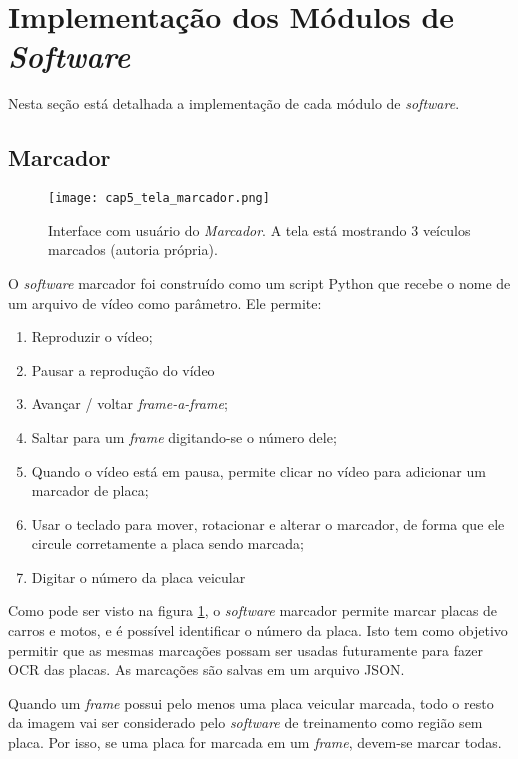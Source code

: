 \section{Implementação dos Módulos de \emph{Software}} \label{sec:cap5_impl}

Nesta seção está detalhada a implementação de cada módulo de \emph{software}.

\subsection{Marcador}

\begin{figure}[!htb]
	\centering
	\texttt{[image: cap5\_tela\_marcador.png]}
	\caption[Interface com usuário do \emph{Marcador}]{
		Interface com usuário do \emph{Marcador}.
		A tela está mostrando 3 veículos marcados (autoria própria).}
	\label{fig:cap5_tela_marcador}
\end{figure}

O \emph{software} marcador foi construído como um script Python que recebe o
nome de um arquivo de vídeo como parâmetro. Ele permite:

\begin{enumerate}
\item Reproduzir o vídeo;
\item Pausar a reprodução do vídeo
\item Avançar / voltar \emph{frame-a-frame};
\item Saltar para um \emph{frame} digitando-se o número dele;
\item Quando o vídeo está em pausa, permite clicar no vídeo para adicionar um
	marcador de placa;
\item Usar o teclado para mover, rotacionar e alterar o marcador, de forma que ele
	circule corretamente a placa sendo marcada;
\item Digitar o número da placa veicular
\end{enumerate}

Como pode ser visto na figura \ref{fig:cap5_tela_marcador}, o \emph{software}
marcador permite marcar placas de
carros e motos, e é possível identificar o número da placa. Isto tem como
objetivo permitir que as mesmas marcações possam ser usadas futuramente para
fazer OCR das placas. As marcações são salvas em um arquivo JSON.

Quando um \emph{frame} possui pelo menos uma placa veicular marcada, todo
o resto da
imagem vai ser considerado pelo \emph{software} de treinamento como região
sem placa.  Por isso, se uma placa for marcada em um \emph{frame}, devem-se
marcar todas.

